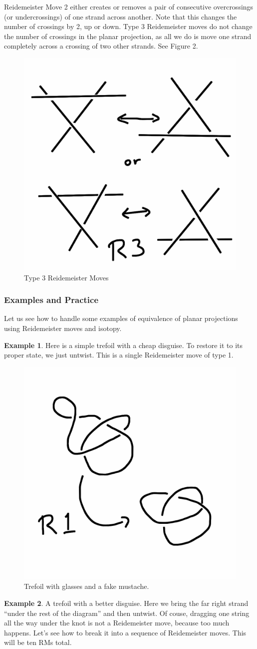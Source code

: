 \documentclass[12pt,letterpaper]{article}
\theoremstyle{definition}
\newtheorem{example}{Example}
\begin{document}
Reidemeister Move 2 either creates or removes a pair of consecutive overcrossings (or undercrossings) of one strand across another.
Note that this changes the number of crossings by 2, up or down.
Type 3 Reidemeister moves do not change the number of crossings in the planar projection, as all we do is move one strand completely across a crossing of two other strands. See Figure 2.

\begin{figure}[ht]
    \centering
    \includegraphics[width=.25\textwidth]{knotpics/r3.png}
    \caption{Type 3 Reidemeister Moves}
\end{figure}


\clearpage

\subsubsection*{Examples and Practice}

Let us see how to handle some examples of equivalence of planar projections using Reidemeister moves and isotopy.

\begin{example}
Here is a simple trefoil with a cheap disguise.
To restore it to its proper state, we just untwist. This is a single Reidemeister move of type 1.
\end{example}

\begin{figure}[h]
    \centering
    \includegraphics[width=.3\textwidth]{knotpics/trefoil-bad-disguise.png}
    \caption{Trefoil with glasses and a fake mustache.}
\end{figure}

\begin{example}
A trefoil with a better disguise.
Here we bring the far right strand ``under the rest of the diagram'' and then untwist. Of couse, dragging one string all the way under the knot is not a Reidemeister move, because too much happens. Let's see how to break it into a sequence of Reidemeister moves. This will be ten RMs total.
\end{example}
\end{document}
